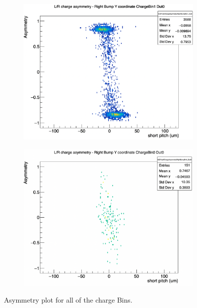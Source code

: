 \begin{figure}[H]
    \vspace{0.5cm}

    \begin{subfigure}[t]{0.45\textwidth}
        \centering
        \includegraphics[width=\textwidth]{images/YAsymmetryRightBin1.png}
        \caption{}
        \label{fig:dist_c}
    \end{subfigure}
    \hfill
    \begin{subfigure}[t]{0.45\textwidth}
        \centering
        \includegraphics[width=\textwidth]{images/YAsymmetryRightBumpBin0.png}
        \caption{}
        \label{fig:dist_d}
    \end{subfigure}

    \caption{Asymmetry plot for all of the charge Bins.}
    \label{fig:asymmetry_bins}
\end{figure}

